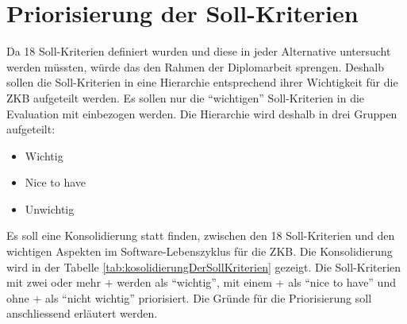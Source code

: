   \section{Priorisierung der Soll-Kriterien}
  
  Da 18 Soll-Kriterien definiert wurden und diese in jeder Alternative 
  untersucht werden müssten, würde das den Rahmen der Diplomarbeit sprengen.
  Deshalb sollen die Soll-Kriterien in eine Hierarchie entsprechend ihrer
  Wichtigkeit für die \ac{ZKB} aufgeteilt werden. Es sollen nur die
  ``wichtigen'' Soll-Kriterien in die Evaluation mit einbezogen werden. Die
  Hierarchie wird deshalb in drei Gruppen aufgeteilt:
  
  \begin{itemize}
    \item Wichtig
    \item Nice to have
    \item Unwichtig
  \end{itemize}
  
  \noindent
  Es soll eine Konsolidierung statt finden, zwischen den 18 Soll-Kriterien und
  den wichtigen Aspekten im Software-Lebenszyklus für die \ac{ZKB}. Die
  Konsolidierung wird in der Tabelle \ref{tab:kosolidierungDerSollKriterien}
  gezeigt. Die Soll-Kriterien mit zwei oder mehr + werden als ``wichtig'', mit
  einem + als ``nice to have'' und ohne + als ``nicht wichtig'' priorisiert. Die
  Gründe für die Priorisierung soll anschliessend erläutert werden.
  
